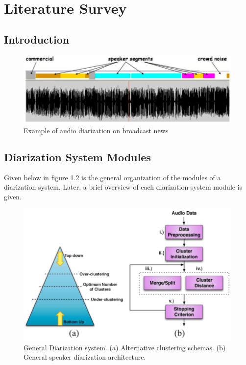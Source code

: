 \chapter{Literature Survey}

\section{Introduction}

\begin{figure}[h]
\includegraphics[width=12cm]{figures/diarization.png}
\centering
\caption{Example of audio diarization on broadcast news \cite{1677976}}
\label{fig:diarization}
\end{figure}

\section{Diarization System Modules}

Given below in figure \ref{fig:modules} is the general organization of the modules of a diarization system. Later, a brief overview of each diarization system module is given.

\begin{figure}[ht]
\includegraphics[width=15cm]{figures/modules.png}
\centering
\caption{General Diarization system. (a) Alternative clustering schemas. (b) General speaker diarization architecture. \cite{anguera2012speaker} }
\label{fig:modules}
\end{figure}

